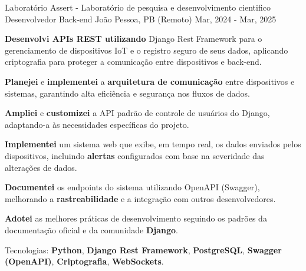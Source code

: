 \begin{cventries}
  \cventry
  {Laboratório Assert - Laboratório de pesquisa e desenvolvimento cientifico} %
  {Desenvolvedor Back-end} %
  {João Pessoa, PB (Remoto)} %
  {Mar, 2024 - Mar, 2025} %
  {
    \begin{cvitems}
      \item {\textbf{Desenvolvi APIs REST utilizando} {Django Rest Framework} para o gerenciamento de dispositivos  {IoT} e o registro seguro de seus dados, aplicando  {criptografia} para proteger a comunicação entre dispositivos e back-end.}
      \item {\textbf{Planejei} e \textbf{implementei} a \textbf{arquitetura de comunicação} entre dispositivos e sistemas, garantindo alta eficiência e segurança nos fluxos de dados.}
      \item {\textbf{Ampliei} e \textbf{customizei} a API padrão de controle de usuários do {Django}, adaptando-a às necessidades específicas do projeto.}
      \item {\textbf{Implementei} um sistema web que exibe, em tempo real, os dados enviados pelos dispositivos, incluindo \textbf{alertas} configurados com base na severidade das alterações de dados.}
      \item {\textbf{Documentei} os endpoints do sistema utilizando  {OpenAPI (Swagger)}, melhorando a \textbf{rastreabilidade} e a integração com outros desenvolvedores.}
      \item {\textbf{Adotei} as melhores práticas de desenvolvimento seguindo os padrões da documentação oficial e da comunidade \textbf{Django}.}
      \item {Tecnologias: \textbf{Python}, \textbf{Django Rest Framework}, \textbf{PostgreSQL}, \textbf{Swagger (OpenAPI)}, \textbf{Criptografia}, \textbf{WebSockets}.}
    \end{cvitems}
  }




\end{cventries}

